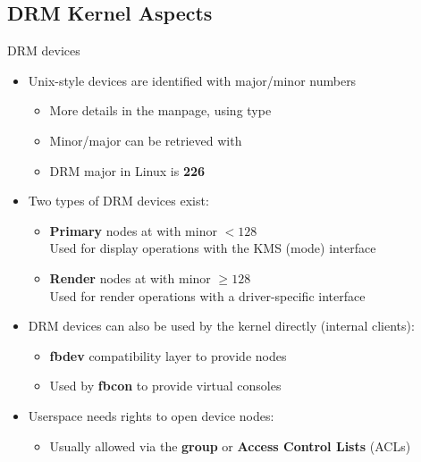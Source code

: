 \subsection{DRM Kernel Aspects}

\begin{frame}{DRM devices}
  \begin{itemize}
  \item Unix-style devices are identified with major/minor numbers
    \begin{itemize}
    \item More details in the  manpage, using  type
    \item Minor/major can be retrieved with 
    \item DRM major in Linux is \textbf{226}
    \end{itemize}
  \item Two types of DRM devices exist:
    \begin{itemize}
    \item \textbf{Primary} nodes at  with minor \(< 128\)\\
    Used for display operations with the KMS (mode) interface
    \item \textbf{Render} nodes at  with minor \(\geq 128\)\\
    Used for render operations with a driver-specific interface
    \end{itemize}
  \item DRM devices can also be used by the kernel directly (internal clients):
    \begin{itemize}
    \item \textbf{fbdev} compatibility layer to provide  nodes
    \item Used by \textbf{fbcon} to provide virtual consoles
    \end{itemize}
  \item Userspace needs rights to open device nodes:
    \begin{itemize}
    \item Usually allowed via the  \textbf{group} or \textbf{Access Control Lists} (ACLs)
    \end{itemize}
  \end{itemize}
\end{frame}

